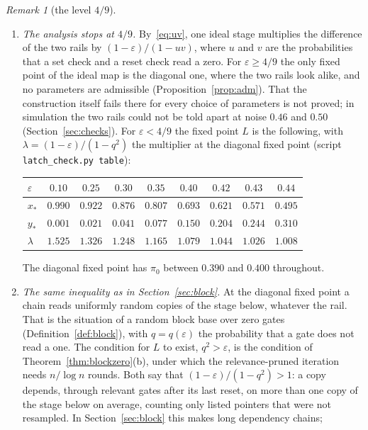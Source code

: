 \documentclass[11pt]{amsart}
\theoremstyle{definition}
\theoremstyle{remark}
\newtheorem{remark}[theorem]{Remark}
\newcommand{\eps}{\varepsilon}
\begin{document}
\begin{remark}[the level $4/9$]\label{rem:latch}
\begin{enumerate}[label=(\roman*),leftmargin=2.4em]
\item \emph{The analysis stops at $4/9$.} By~\eqref{eq:uv}, one ideal stage multiplies the
difference of the two rails by $(1-\eps)/(1-uv)$, where $u$ and $v$ are the probabilities that a
set check and a reset check read a zero. For $\eps\ge4/9$ the only fixed point of the ideal map is
the diagonal one, where the two rails look alike, and no parameters are admissible
(Proposition~\ref{prop:adm}). That the construction itself fails there for every choice of
parameters is not proved; in simulation the two rails could not be told apart at noise $0.46$ and
$0.50$ (Section~\ref{sec:checks}). For $\eps<4/9$ the fixed point $L$ is the following, with $\lambda=(1-\eps)/(1-q^2)$ the multiplier at
the diagonal fixed point (script \texttt{latch\_check.py table}):
\begin{center}
\begin{tabular}{lcccccccc}
\toprule
$\eps$ & $0.10$ & $0.25$ & $0.30$ & $0.35$ & $0.40$ & $0.42$ & $0.43$ & $0.44$\\
\midrule
$x_*$ & $0.990$ & $0.922$ & $0.876$ & $0.807$ & $0.693$ & $0.621$ & $0.571$ & $0.495$\\
$y_*$ & $0.001$ & $0.021$ & $0.041$ & $0.077$ & $0.150$ & $0.204$ & $0.244$ & $0.310$\\
$\lambda$ & $1.525$ & $1.326$ & $1.248$ & $1.165$ & $1.079$ & $1.044$ & $1.026$ & $1.008$\\
\bottomrule
\end{tabular}
\end{center}
The diagonal fixed point has $\pi_0$ between $0.390$ and $0.400$ throughout.
\item \emph{The same inequality as in Section~\ref{sec:block}.} At the diagonal fixed point a
chain reads uniformly random copies of the stage below, whatever the rail. That is the situation
of a random block base over zero gates (Definition~\ref{def:block}), with $q=q(\eps)$ the
probability that a gate does not read a one. The condition for $L$ to exist, $q^2>\eps$, is the
condition of Theorem~\ref{thm:blockzero}(b), under which the relevance-pruned iteration needs
$n/\log n$ rounds. Both say that $(1-\eps)/(1-q^2)>1$: a copy depends, through relevant gates after
its last reset, on more than one copy of the stage below on average, counting only listed
pointers that were not resampled. In Section~\ref{sec:block} this makes long dependency chains;

\end{enumerate}
\end{remark}
\end{document}

